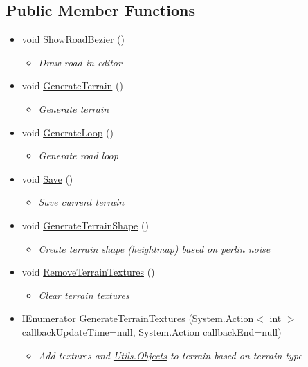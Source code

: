 \subsection*{Public Member Functions}
\begin{itemize}
\item[]  
void \mbox{\hyperlink{classRacingGameBot_1_1Terrains_1_1TerrainGenerator_a6059fe2042e6d22c87cdaa24c484ecb3}{ShowRoadBezier}} ()
\begin{itemize}\small\item[] \em Draw road in editor \end{itemize}\item[]  
void \mbox{\hyperlink{classRacingGameBot_1_1Terrains_1_1TerrainGenerator_a0675f55b32ed9be71281aae154beace3}{GenerateTerrain}} ()
\begin{itemize}\small\item[] \em Generate terrain \end{itemize}\item[]  
void \mbox{\hyperlink{classRacingGameBot_1_1Terrains_1_1TerrainGenerator_a42ee9ad27a6bd31a13bc1afdf18ba4cc}{GenerateLoop}} ()
\begin{itemize}\small\item[] \em Generate road loop \end{itemize}\item[]  
void \mbox{\hyperlink{classRacingGameBot_1_1Terrains_1_1TerrainGenerator_a0080a467970dfacdbb9c70c282e91e5d}{Save}} ()
\begin{itemize}\small\item[] \em Save current terrain \end{itemize}\item[]  
void \mbox{\hyperlink{classRacingGameBot_1_1Terrains_1_1TerrainGenerator_ace159b51c13eb1afed8cf830374fc187}{GenerateTerrainShape}} ()
\begin{itemize}\small\item[] \em Create terrain shape (heightmap) based on perlin noise \end{itemize}\item[]  
void \mbox{\hyperlink{classRacingGameBot_1_1Terrains_1_1TerrainGenerator_a2fccf1172cbe939317ee9b1c1e3bb837}{RemoveTerrainTextures}} ()
\begin{itemize}\small\item[] \em Clear terrain textures \end{itemize}\item[]  
IEnumerator \mbox{\hyperlink{classRacingGameBot_1_1Terrains_1_1TerrainGenerator_a3bcb40196402e8f4393c9b3710e7a25b}{GenerateTerrainTextures}} (System.Action$<$ int $>$ callbackUpdateTime=null, System.Action callbackEnd=null)
\begin{itemize}\small\item[] \em Add textures and \mbox{\hyperlink{classRacingGameBot_1_1Utils_1_1Objects}{Utils.Objects}} to terrain based on terrain type \end{itemize}\end{itemize}
